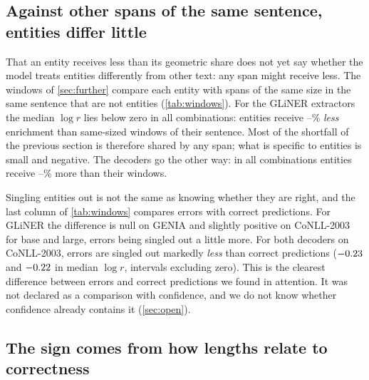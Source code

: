 \documentclass[11pt,a4paper]{article}
\newcommand{\gliner}{GLiNER}
\begin{document}
\subsection{Against other spans of the same sentence, entities differ little}
\label{sec:res-windows}

That an entity receives less than its geometric share does not yet say whether the model treats entities differently from
other text: any span might receive less. The windows of \cref{sec:further} compare each entity with spans of the same size
in the same sentence that are not entities (\cref{tab:windows}). For the \gliner{} extractors the median $\log r$ lies
below zero in all \winEncN{} combinations: entities receive \winEncPctMin--\winEncPctMax\% \emph{less} enrichment than
same-sized windows of their sentence. Most of the shortfall of the previous section is therefore shared by any span; what
is specific to entities is small and negative. The decoders go the other way: in all \winDecN{} combinations entities
receive \winDecPctMin--\winDecPctMax\% more than their windows.

Singling entities out is not the same as knowing whether they are right, and the last column of \cref{tab:windows} compares
errors with correct predictions. For \gliner{} the difference is null on GENIA and slightly positive on CoNLL-2003 for base
and large, errors being singled out a little more. For both decoders on CoNLL-2003, errors are singled out markedly
\emph{less} than correct predictions ($-0.23$ and $-0.22$ in median $\log r$, intervals
excluding zero). This is the clearest difference between errors and correct predictions we found in attention. It was not
declared as a comparison with confidence, and we do not know whether confidence already contains it (\cref{sec:open}).

\begin{table}[t]
\centering
\small
\caption{Entities against windows of the same size in the same sentence that are not entities (\cref{sec:further}), on the
test partition. $r$: enrichment of the entity over the mean enrichment of its windows; the median of $\log r$ is below zero
when entities receive less than other spans. Last column: median $\log r$ of errors minus that of correct predictions, with
95\% interval; bold: the interval excludes zero. Decoders: causal reference.}
\label{tab:windows}

\end{table}

\subsection{The sign comes from how lengths relate to correctness}
\label{sec:res-corpus}
\end{document}

